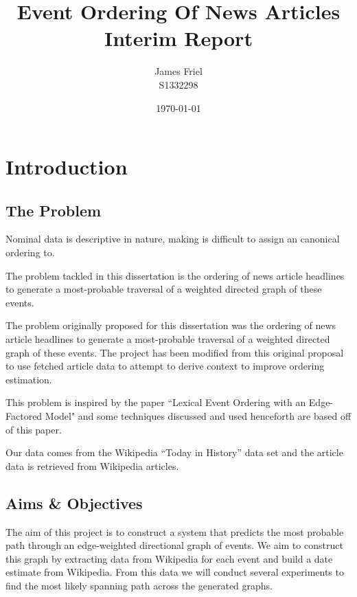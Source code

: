 \documentclass[12pt]{report}
\begin{document}
\title{Event Ordering Of News Articles \\ Interim Report}
\author{
        James Friel \\
                S1332298\\
}
\date{\today}


\maketitle

\tableofcontents

\chapter{Introduction}
        \section{The Problem}
        Nominal data is descriptive in nature, making is difficult to assign an canonical ordering to.
        
        The problem tackled in this dissertation is the ordering of news article headlines to generate
        a most-probable traversal of a weighted directed graph of these events.

        The problem originally proposed for this dissertation was the ordering of news article headlines
        to generate a most-probable traversal of a weighted directed graph of these events. The project
        has been modified from this original proposal to use fetched article data to attempt to derive
        context to improve ordering estimation.

        This problem is inspired by the paper ``Lexical Event Ordering with an Edge-Factored Model" \cite{abend2015lexical} and some
        techniques discussed and used henceforth are based off of this paper.


        Our data comes from the Wikipedia ``Today in History'' data set and the article data is retrieved
        from Wikipedia articles.

        \section{Aims \& Objectives}
        The aim of this project is to construct a system that predicts the most probable path
        through an edge-weighted directional graph of events.
        We aim to construct this graph by extracting data from Wikipedia for each event and
        build a date estimate from Wikipedia. From this data we will conduct several experiments
        to find the most likely spanning path across the generated graphs.
\end{document}
